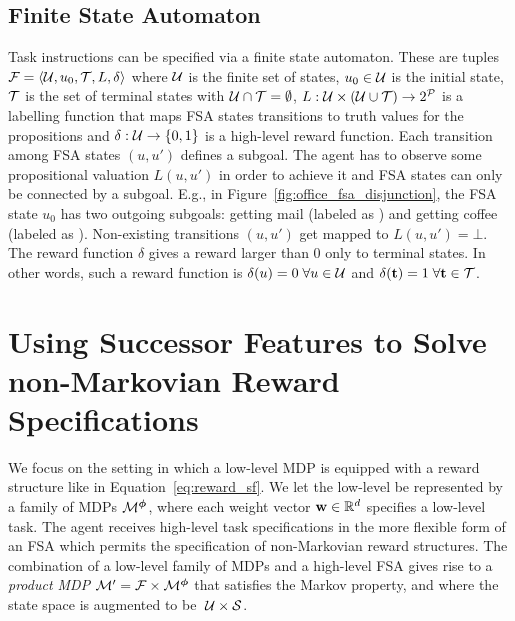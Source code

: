 \subsection{Finite State Automaton} Task instructions can be specified via a finite state automaton. These are tuples ${\mathcal{F}=\langle \mathcal{U},u_0,\mathcal{T},L,\delta\rangle}$ where $\mathcal{U}$ is the finite set of states, $u_0\in\mathcal{U}$ is the initial state, $\mathcal{T}$ is the set of terminal states with $\mathcal{U}\cap\mathcal{T}=\emptyset$, $L:\mathcal{U}\times(\mathcal{U}\cup\mathcal{T})\rightarrow 2^{\mathcal{P}}$ is a labelling function that maps FSA states transitions to truth values for the propositions and $\delta:\mathcal{U}\rightarrow \{0, 1\}$ is a high-level reward function. Each transition among FSA states $(u, u')$ defines a subgoal. The agent has to observe some propositional valuation $L(u, u')$ in order to achieve it and FSA states can only be connected by a subgoal. E.g., in Figure~\ref{fig:office_fsa_disjunction}, the FSA state $u_0$ has two outgoing subgoals: getting mail (labeled as \mail) and getting coffee (labeled as \coffee). Non-existing transitions $(u, u')$ get mapped to $L(u, u')=\bot$. The reward function $\delta$ gives a reward larger than 0 only to terminal states. In other words, such a reward function is $\delta(u)=0\;\forall u\in\mathcal{U}$ and $\delta(\mathbf{t})=1\;\forall \mathbf{t}\in\mathcal{T}$. 

%     
%     

\section{Using Successor Features to Solve non-Markovian Reward Specifications}

We focus on the setting in which a low-level MDP is equipped with a reward structure like in Equation~\eqref{eq:reward_sf}. We let the low-level be represented by a family of MDPs $\mathcal{M}^{\boldsymbol{\phi}}$, where each weight vector $\mathbf{w}\in\mathbb{R}^d$ specifies a low-level task. The agent receives high-level task specifications in the more flexible form of an FSA which permits the specification of non-Markovian reward structures. The combination of a low-level family of MDPs and a high-level FSA gives rise to a \textit{product MDP} $\mathcal{M}'=\mathcal{F}\times\mathcal{M}^{\boldsymbol{\phi}}$ that satisfies the Markov property, and where the state space is augmented to be $\;\mathcal{U}\times\mathcal{S}$.

